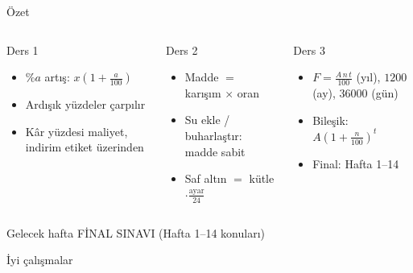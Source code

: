 \documentclass[aspectratio=169,11pt]{beamer}
\begin{document}
\begin{frame}{Özet}
\begin{columns}[t]
\begin{block}{Ders 1}
\begin{itemize}
\item \(\%a\) artış: \(x(1+\frac{a}{100})\)
\item Ardışık yüzdeler çarpılır
\item Kâr yüzdesi maliyet, indirim etiket üzerinden
\end{itemize}
\end{block}
\begin{block}{Ders 2}
\begin{itemize}
\item Madde \(=\) karışım \(\times\) oran
\item Su ekle / buharlaştır: madde sabit
\item Saf altın \(=\) kütle \(\cdot\frac{\text{ayar}}{24}\)
\end{itemize}
\end{block}
\begin{block}{Ders 3}
\begin{itemize}
\item \(F=\frac{A\,n\,t}{100}\) (yıl), \(1200\) (ay), \(36000\) (gün)
\item Bileşik: \(A(1+\frac{n}{100})^t\)
\item Final: Hafta 1--14
\end{itemize}
\end{block}
\end{columns}
\vspace{6pt}
\begin{alertblock}{Gelecek hafta}
FİNAL SINAVI (Hafta 1--14 konuları)
\end{alertblock}
\end{frame}

\begin{frame}
\centering\Large İyi çalışmalar
\end{frame}
\end{document}
